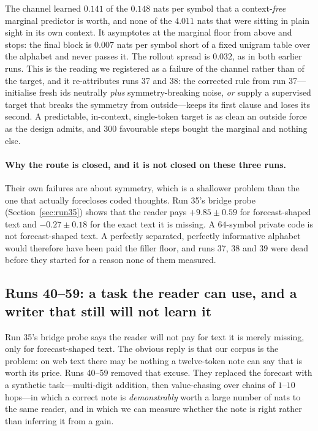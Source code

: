\documentclass{article} %
\begin{document}
The channel learned $0.141$ of the $0.148$ nats per symbol that a context-\emph{free} marginal
predictor is worth, and none of the $4.011$ nats that were sitting in plain sight in its own
context. It asymptotes at the marginal floor from above and stops: the final block is $0.007$
nats per symbol short of a fixed unigram table over the alphabet and never passes it. The rollout
spread is $0.032$, as in both earlier runs. This is the reading we registered as a failure of the
channel rather than of the target, and it re-attributes runs 37 and 38: the corrected rule from
run 37---initialise fresh ids neutrally \emph{plus} symmetry-breaking noise, \emph{or} supply a
supervised target that breaks the symmetry from outside---keeps its first clause and loses its
second. A predictable, in-context, single-token target is as clean an outside force as the design
admits, and $300$ favourable steps bought the marginal and nothing else.

\paragraph{Why the route is closed, and it is not closed on these three runs.} Their own failures
are about symmetry, which is a shallower problem than the one that actually forecloses coded
thoughts. Run 35's bridge probe (Section~\ref{sec:run35}) shows that the reader pays $+9.85 \pm
0.59$ for forecast-shaped text and $-0.27 \pm 0.18$ for the exact text it is missing. A $64$-symbol
private code is not forecast-shaped text. A perfectly separated, perfectly informative alphabet
would therefore have been paid the filler floor, and runs 37, 38 and 39 were dead before they
started for a reason none of them measured.

\subsection{Runs 40--59: a task the reader can use, and a writer that still will not learn it}
\label{sec:synthetic}

Run 35's bridge probe says the reader will not pay for text it is merely missing, only for
forecast-shaped text. The obvious reply is that our corpus is the problem: on web text there may be
nothing a twelve-token note can say that is worth its price. Runs 40--59 removed that excuse. They
replaced the forecast with a synthetic task---multi-digit addition, then value-chasing over chains of
$1$--$10$ hops---in which a correct note is \emph{demonstrably} worth a large number of nats to the
same reader, and in which we can measure whether the note is right rather than inferring it from a
gain.
\end{document}
